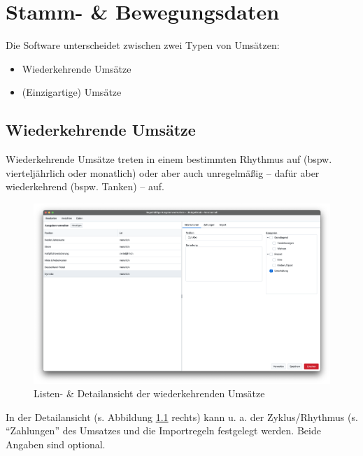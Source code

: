 \chapter{Stamm- \& Bewegungsdaten}

Die Software unterscheidet zwischen zwei Typen von Umsätzen:

\begin{itemize}[nosep]
	\item Wiederkehrende Umsätze
	\item (Einzigartige) Umsätze
\end{itemize}

\section{Wiederkehrende Umsätze} \label{sec:fixedExpenses}

Wiederkehrende Umsätze treten in einem bestimmten Rhythmus auf (bspw. vierteljährlich oder monatlich) oder aber auch unregelmäßig -- dafür aber wiederkehrend (bspw. Tanken) -- auf.

\begin{figure}[ht!]
	\centering
	\includegraphics[width=\textwidth]{img/Screenshot-FixedExpenses-MDV}
	\vspace{-2em}
	\caption{Listen- \& Detailansicht der wiederkehrenden Umsätze}
	\label{fig:mdvFixedExpenses}
\end{figure}

In der Detailansicht (s. Abbildung \ref{fig:mdvFixedExpenses} rechts) kann u. a. der Zyklus/Rhythmus (s. "`Zahlungen"' des Umsatzes und die Importregeln festgelegt werden. Beide Angaben sind optional.

